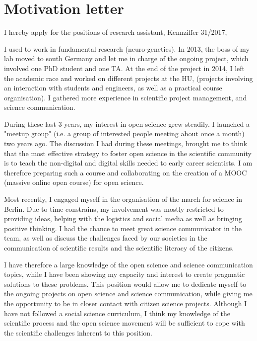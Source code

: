 \section* {Motivation letter}

I hereby apply for the positions of research assistant, Kennziffer 31/2017, 

I used to work in fundamental research (neuro-genetics). In 2013, the boss of my lab moved to south Germany and let me in charge of the ongoing project, which involved one PhD student and one TA. At the end of the project in 2014, I left the academic race and worked on different projects at the HU, (projects involving an interaction with students and engineers, as well as a practical course organisation). I gathered more experience in scientific project management, and science communication.

During these last 3 years, my interest in open science grew steadily. I launched a "meetup group" (i.e. a group of interested people meeting about once a month) two years ago. The discussion I had during these meetings, brought me to think that the most effective strategy to foster open science in the scientific community is to teach the non-digital and digital skills needed to early career scientists. I am therefore preparing such a course and collaborating on the creation of a MOOC (massive online open course) for open science.

Most recently, I engaged myself in the organisation of the march for science in Berlin. Due to time constrains, my involvement was mostly restricted to providing ideas, helping with the logistics and social media as well as bringing positive thinking. I had the chance to meet great science communicator in the team, as well as discuss the challenges faced by our societies in the communication of scientific results and the scientific literacy of the citizens.

I have therefore a large knowledge of the open science and science communication topics, while I have been showing my capacity and interest to create pragmatic solutions to these problems. This position would  allow me to dedicate myself to the ongoing projects on open science and science communication, while giving me the opportunity to be in closer contact with citizen science projects. Although I have not followed a social science curriculum, I think my knowledge of the scientific process and the open science movement will be sufficient to cope with the scientific challenges inherent to this position. 

